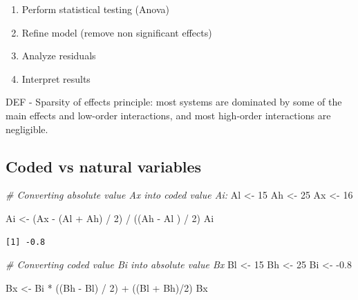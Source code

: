 \documentclass[
]{book}
\newenvironment{Shaded}{\begin{snugshade}}{\end{snugshade}}
\newcommand{\CommentTok}[1]{\textcolor[rgb]{0.56,0.35,0.01}{\textit{#1}}}
\newcommand{\DecValTok}[1]{\textcolor[rgb]{0.00,0.00,0.81}{#1}}
\newcommand{\FloatTok}[1]{\textcolor[rgb]{0.00,0.00,0.81}{#1}}
\newcommand{\NormalTok}[1]{#1}
\newcommand{\OtherTok}[1]{\textcolor[rgb]{0.56,0.35,0.01}{#1}}
\newcommand{\SpecialCharTok}[1]{\textcolor[rgb]{0.00,0.00,0.00}{#1}}
\providecommand{\tightlist}{%
  \setlength{\itemsep}{0pt}\setlength{\parskip}{0pt}}
\begin{document}
\begin{enumerate}
\def\labelenumi{\arabic{enumi}.}
\setcounter{enumi}{2}
\tightlist
\item
  Perform statistical testing (Anova)
\item
  Refine model (remove non significant effects)
\item
  Analyze residuals
\item
  Interpret results
\end{enumerate}

DEF - Sparsity of effects principle: most systems are dominated by some of the main effects and low-order interactions, and most high-order interactions are negligible.

\hypertarget{coded-vs-natural-variables}{%
\subsection{Coded vs natural variables}\label{coded-vs-natural-variables}}

\begin{Shaded}
\begin{Highlighting}[]
\CommentTok{\# Converting absolute value Ax into coded value Ai:}
\NormalTok{Al }\OtherTok{\textless{}{-}} \DecValTok{15}
\NormalTok{Ah }\OtherTok{\textless{}{-}} \DecValTok{25}
\NormalTok{Ax }\OtherTok{\textless{}{-}} \DecValTok{16}

\NormalTok{Ai }\OtherTok{\textless{}{-}}\NormalTok{ (Ax }\SpecialCharTok{{-}}\NormalTok{ (Al }\SpecialCharTok{+}\NormalTok{ Ah) }\SpecialCharTok{/} \DecValTok{2}\NormalTok{) }\SpecialCharTok{/}\NormalTok{ ((Ah }\SpecialCharTok{{-}}\NormalTok{  Al ) }\SpecialCharTok{/} \DecValTok{2}\NormalTok{)}
\NormalTok{Ai}
\end{Highlighting}
\end{Shaded}

\begin{verbatim}
[1] -0.8
\end{verbatim}

\begin{Shaded}
\begin{Highlighting}[]
\CommentTok{\# Converting coded value Bi into absolute value Bx}
\NormalTok{Bl }\OtherTok{\textless{}{-}} \DecValTok{15}
\NormalTok{Bh }\OtherTok{\textless{}{-}} \DecValTok{25}
\NormalTok{Bi }\OtherTok{\textless{}{-}} \SpecialCharTok{{-}}\FloatTok{0.8}

\NormalTok{Bx }\OtherTok{\textless{}{-}}\NormalTok{ Bi }\SpecialCharTok{*}\NormalTok{ ((Bh }\SpecialCharTok{{-}}\NormalTok{ Bl) }\SpecialCharTok{/} \DecValTok{2}\NormalTok{) }\SpecialCharTok{+}\NormalTok{ ((Bl }\SpecialCharTok{+}\NormalTok{ Bh)}\SpecialCharTok{/}\DecValTok{2}\NormalTok{)}
\NormalTok{Bx}
\end{Highlighting}
\end{Shaded}
\end{document}
